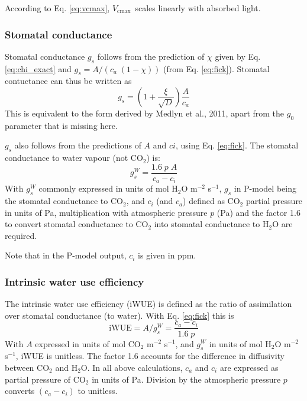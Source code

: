 \documentclass{myreport}
\newcommand{\vcmax}{$V_{\text{cmax}}$}
\begin{document}
According to Eq. \ref{eq:vcmax}, \vcmax\ scales linearly with absorbed light. 


\subsubsection{Stomatal conductance}
Stomatal conductance $g_s$ follows from the prediction of $\chi$ given by Eq. \ref{eq:chi_exact} and $g_s = A / ( c_a\;(1-\chi) )$ (from Eq. \ref{eq:fick}). Stomatal contuctance can thus be written as
\begin{equation}
    g_s = \left( 1 + \frac{\xi}{\sqrt{D}} \right) \frac{A}{c_a}
\end{equation}
This is equivalent to the form derived by Medlyn et al., 2011, apart from the $g_0$ parameter that is missing here.

$g_s$ also follows from the predictions of $A$ and $ci$, using Eq. \ref{eq:fick}. The stomatal conductance to water vapour (not CO$_2$) is:
\begin{equation}
g_s^W = \frac{1.6 \; p\; A}{c_a - c_i}
\end{equation}
With $g_s^W$ commonly expressed in units of mol H$_2$O m$^{-2}$ s$^{-1}$, $g_s$ in P-model being the stomatal conductance to CO$_2$, and $c_i$ (and $c_a$) defined as CO$_2$ partial pressure in units of Pa, multiplication with atmospheric pressure $p$ (Pa) and the factor 1.6 to convert stomatal conductance to CO$_2$ into stomatal conductance to H$_2$O are required.

Note that in the P-model output, $c_i$ is given in ppm.

\subsubsection{Intrinsic water use efficiency}
The intrinsic water use efficiency (iWUE) is defined as the ratio of assimilation over stomatal conductance (to water). With Eq. \ref{eq:fick} this is
\begin{equation}
    \mathrm{iWUE} = A / g_s^W = \frac{c_a - c_i}{1.6\;p}
\end{equation}
With $A$ expressed in units of mol CO$_2$ m$^{-2}$ s$^{-1}$, and $g_s^W$ in units of mol H$_2$O m$^{-2}$ s$^{-1}$, iWUE is unitless. The factor 1.6 accounts for the difference in diffusivity between CO$_2$ and H$_2$O. In all above calculations, $c_a$ and $c_i$ are expressed as partial pressure of CO$_2$ in units of Pa. Division by the atmospheric pressure $p$ converts $(c_a - c_i)$ to unitless.
\end{document}
